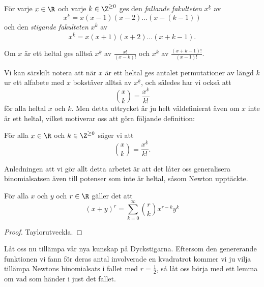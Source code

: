 \documentclass[nobib]{tufte-handout}
\begin{document}
\begin{definition}
    För varje $x\in \R$ och varje $k \in \Z^{\geq 0}$ ges den \emph{fallande fakulteten} $x^{\underline{k}}$ av
    $$x^{\underline{k}} = x(x-1)(x-2)\ldots(x-(k-1))$$
    och den \emph{stigande fakulteten} $x^{\overline{k}}$ av
    $$x^{\overline{k}} = x(x+1)(x+2)\ldots(x+k-1).$$

    Om $x$ är ett heltal ges alltså $x^{\underline{k}}$ av $\frac{x!}{(x-k)!}$ och $x^{\overline{k}}$ av $\frac{(x+k-1)!}{(x-1)!}$.
\end{definition}

Vi kan särskilt notera att när $x$ är ett heltal ges antalet permutationer av längd $k$ ur ett alfabete med $x$ bokstäver alltså av $x^{\underline{k}}$, och således har vi också att
$$\binom{x}{k} = \frac{x^{\underline{k}}}{k!}$$
för alla heltal $x$ och $k$. Men detta uttrycket är ju helt väldefinierat även om $x$ inte är ett heltal, vilket motiverar oss att göra följande definition:

\begin{definition}
    För alla $x \in \R$ och $k \in \Z^{\geq 0}$ säger vi att
    $$\binom{x}{k} = \frac{x^{\underline{k}}}{k!}.$$
\end{definition}

Anledningen att vi gör allt detta arbetet är att det låter oss generalisera binomialsatsen även till potenser som inte är heltal, såsom Newton upptäckte.

\begin{theorem}
    För alla $x$ och $y$ och $r \in \R$ gäller det att
    $$(x + y)^r = \sum_{k=0}^{\infty} \binom{r}{k} x^{r-k} y^k$$

    \begin{proof}
        Taylorutveckla.
    \end{proof}
\end{theorem}

Låt oss nu tillämpa vår nya kunskap på Dyckstigarna. Eftersom den genererande funktionen vi fann för deras antal involverade en kvadratrot kommer vi ju vilja tillämpa Newtons binomialsats i fallet med $r = \frac{1}{2}$, så låt oss börja med ett lemma om vad som händer i just det fallet.
\end{document}
